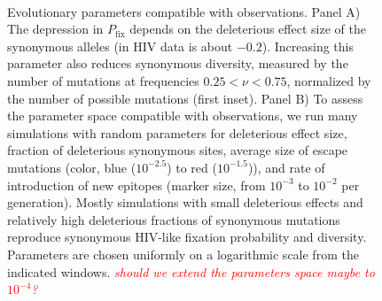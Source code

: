 \documentclass[rmp, twocolumn]{revtex4}
\newcommand{\comment}[1]{\textit{\textcolor{red}{#1}}}
\begin{document}
\begin{figure}
\begin{center}
\\
\caption{Evolutionary parameters compatible with observations.
Panel A) The depression in $P_\text{fix}$ depends on the deleterious
effect size of the synonymous alleles (in HIV data is about $-0.2$).
Increasing this parameter also reduces synonymous
diversity, measured by the number of mutations at frequencies $0.25 < \nu < 0.75$,
normalized by the number of possible mutations (first inset).
Panel B) To assess the parameter space compatible with observations, we run many
simulations with random parameters for deleterious effect size, fraction of
deleterious synonymous sites, average size of escape mutations (color, blue ($10^{-2.5}$) to red ($10^{-1.5}$)), and rate of
introduction of new epitopes (marker size, from $10^{-3}$ to $10^{-2}$ per
generation). Mostly simulations with small deleterious effects and relatively
high deleterious fractions of synonymous mutations reproduce synonymous HIV-like
fixation probability and diversity. Parameters are chosen uniformly on a
logarithmic scale from the indicated windows. \comment{should we extend the
parameters space maybe to $10^{-4}$?}}
\label{fig:simheat}
\end{center}
\end{figure}
\end{document}
